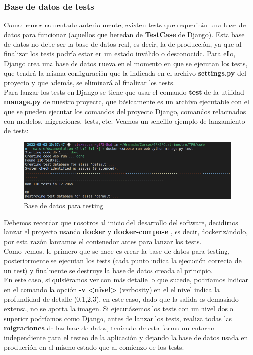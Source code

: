 \subsubsection{Base de datos de tests}
Como hemos comentado anteriormente, existen tests que requerirán una base de datos para
funcionar (aquellos que heredan de \textbf{TestCase} de Django). Esta base de datos no debe
ser la base de datos real, es decir, la de producción, ya que al finalizar los tests podría
estar en un estado inválido o desconocido. Para ello, Django crea una base de datos nueva
en el momento en que se ejecutan los tests, que tendrá la misma configuración que la
indicada en el archivo \textbf{settings.py} del proyecto y que además, se eliminará al
finalizar los tests.\\

Para lanzar los tests en Django se tiene que usar el comando \textbf{test} de la utilidad
\textbf{manage.py} de nuestro proyecto, que básicamente es un archivo ejecutable con el
que se pueden ejecutar los comandos del proyecto Django, comandos relacinados con modelos,
migraciones, tests, etc. Veamos un sencillo ejemplo de lanzamiento de tests:

    \begin{figure}[H]
        \centering
        \includegraphics[scale=0.40]{imagenes/db-test.png}
        \caption{Base de datos para testing}
        \label{fig:db-test}
    \end{figure}

Debemos recordar que nosotros al inicio del desarrollo del software, decidimos lanzar el
proyecto usando \textbf{docker} \cite{docker} y \textbf{docker-compose} \cite{docker-compose},
es decir, dockerizándolo, por esta razón lanzamos el contenedor antes para lanzar los
tests.\\

Como vemos, lo primero que se hace es crear la base de datos para testing, posteriormente
se ejecutan los tests (cada punto indica la ejecución correcta de un test) y finalmente se
destruye la base de datos creada al principio.\\

En este caso, si quisiéramos ver con más detalle lo que sucede, podríamos indicar en el
comando la opción \textbf{-v <nivel>} (verbosity) en el el nivel indica la profundidad de
detalle (0,1,2,3), en este caso, dado que la salida es demasiado extensa, no se aporta la
imagen. Si ejecutásemos los tests con un nivel dos o superior podríamos como Django, antes
de lanzar los tests, realiza todas las \textbf{migraciones} de las base de datos,
teniendo de esta forma un entorno independiente para el testeo de la aplicación y dejando
la base de datos usada en producción en el mismo estado que al comienzo de los tests.\\

